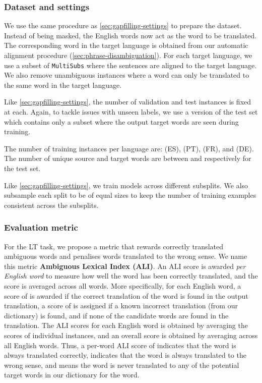 \documentclass[twocolumn]{svjour3}          \smartqed  \usepackage{graphicx}
\newcommand{\multisubs}{\texttt{MultiSubs}\xspace}
\begin{document}
\subsubsection{Dataset and settings}
\label{sec:mlt-dataset}

We use the same procedure as \ref{sec:gapfilling-settings} to prepare the dataset. Instead of being masked, the English words now act as the word to be translated. The corresponding word in the target language is obtained from our automatic alignment procedure (\ref{sec:phrase-disambiguation}). For each target language, we use a subset of \multisubs where the sentences are aligned to the target language. We also remove unambiguous instances where a word can only be translated to the same word in the target language. 

Like \ref{sec:gapfilling-settings}, the number of validation and test instances is fixed at  each. Again, to tackle issues with unseen labels, we use a version of the test set which contains only a subset where the output target words are seen during training.

The number of training instances per language are:  (ES),  (PT),  (FR), and  (DE). The number of unique source and target words are between  and  respectively for the test set.

Like \ref{sec:gapfilling-settings}, we train models across different  subsplits. We also subsample each split to be of equal sizes to keep the number of training examples consistent across the subsplits.







\subsubsection{Evaluation metric}
\label{sec:mlt-metric}
For the LT task, we propose a metric that rewards correctly translated ambiguous words and penalises words translated to the wrong sense. We name this metric \textbf{Ambiguous Lexical Index (ALI)}. An ALI score is awarded \emph{per English word} to measure how well the word has been correctly translated, 
and the score is averaged across all words. More specifically, for each English word, a score of  is awarded if the correct translation of the word is found in the output translation, a score of  is assigned if a known incorrect translation (from our dictionary) is found, and  if none of the candidate words are found in the translation. The ALI scores for each English word is obtained by averaging the scores of individual instances, and an overall score is obtained by averaging across all English words. Thus, a per-word ALI score of  indicates that the word is always translated correctly,  indicates that the word is always translated to the wrong sense, and  means the word is never translated to any of the potential target words in our dictionary for the word. 
\end{document}
